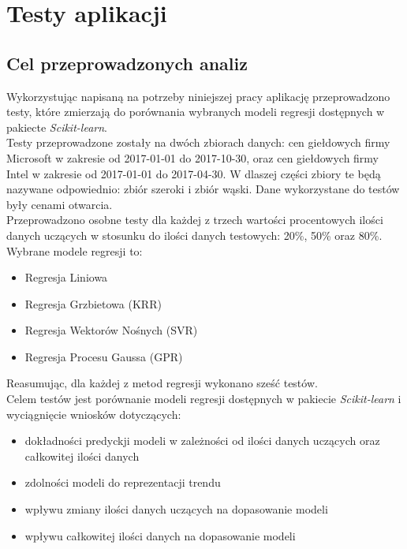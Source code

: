 
\chapter{Testy aplikacji}

\section{Cel przeprowadzonych analiz}

Wykorzystując napisaną na potrzeby niniejszej pracy aplikację przeprowadzono testy, które zmierzają do porównania wybranych modeli regresji dostępnych w pakiecte \textit{Scikit-learn}.\\

Testy przeprowadzone zostały na dwóch zbiorach danych: cen giełdowych firmy Microsoft w zakresie od 2017-01-01 do 2017-10-30, oraz cen giełdowych firmy Intel w zakresie od 2017-01-01 do 2017-04-30.
W dlaszej części zbiory te będą nazywane odpowiednio: zbiór szeroki i zbiór wąski.
Dane wykorzystane do testów były cenami otwarcia.\\

Przeprowadzono osobne testy dla każdej z trzech wartości procentowych ilości danych uczących w stosunku do ilości danych testowych: 20\%, 50\% oraz 80\%.\\

Wybrane modele regresji to:
\begin{itemize}
 \item Regresja Liniowa
 \item Regresja Grzbietowa (KRR)
 \item Regresja Wektorów Nośnych (SVR)
 \item Regresja Procesu Gaussa (GPR)
\end{itemize}

Reasumując, dla każdej z metod regresji wykonano sześć testów.\\

Celem testów jest porównanie modeli regresji dostępnych w pakiecie \textit{Scikit-learn} i wyciągnięcie wniosków dotyczących:
\begin{itemize}
 \item dokładności predyckji modeli w zależności od ilości danych uczących oraz całkowitej ilości danych
 \item zdolności modeli do reprezentacji trendu
 \item wpływu zmiany ilości danych uczących na dopasowanie modeli
 \item wpływu całkowitej ilości danych na dopasowanie modeli
\end{itemize}

